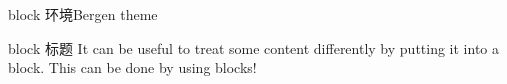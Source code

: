 \documentclass{ctexbeamer}
\begin{document}
\begin{frame}{block 环境}{Bergen theme}

\begin{block}{block 标题}
  It can be useful to treat some content differently by putting it into a block. This can be done by using blocks!
\end{block}

\end{frame}
\end{document}
